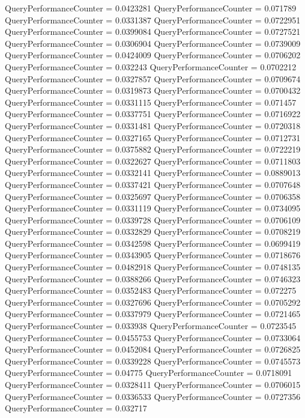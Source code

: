\documentclass[9pt]{article}
\theoremstyle{plain}
\theoremstyle{definition}
\theoremstyle{remark}
\numberwithin{equation}{section}
\begin{document}
QueryPerformanceCounter  =  0.0423281
QueryPerformanceCounter  =  0.071789
QueryPerformanceCounter  =  0.0331387
QueryPerformanceCounter  =  0.0722951
QueryPerformanceCounter  =  0.0399084
QueryPerformanceCounter  =  0.0727521
QueryPerformanceCounter  =  0.0306904
QueryPerformanceCounter  =  0.0739009
QueryPerformanceCounter  =  0.0424009
QueryPerformanceCounter  =  0.0706202
QueryPerformanceCounter  =  0.032243
QueryPerformanceCounter  =  0.0702212
QueryPerformanceCounter  =  0.0327857
QueryPerformanceCounter  =  0.0709674
QueryPerformanceCounter  =  0.0319873
QueryPerformanceCounter  =  0.0700432
QueryPerformanceCounter  =  0.0331115
QueryPerformanceCounter  =  0.071457
QueryPerformanceCounter  =  0.0337751
QueryPerformanceCounter  =  0.0716922
QueryPerformanceCounter  =  0.0331481
QueryPerformanceCounter  =  0.0720318
QueryPerformanceCounter  =  0.0327165
QueryPerformanceCounter  =  0.0712731
QueryPerformanceCounter  =  0.0375882
QueryPerformanceCounter  =  0.0722219
QueryPerformanceCounter  =  0.0322627
QueryPerformanceCounter  =  0.0711803
QueryPerformanceCounter  =  0.0332141
QueryPerformanceCounter  =  0.0889013
QueryPerformanceCounter  =  0.0337421
QueryPerformanceCounter  =  0.0707648
QueryPerformanceCounter  =  0.0325697
QueryPerformanceCounter  =  0.0706358
QueryPerformanceCounter  =  0.0331119
QueryPerformanceCounter  =  0.0734095
QueryPerformanceCounter  =  0.0339728
QueryPerformanceCounter  =  0.0706109
QueryPerformanceCounter  =  0.0332829
QueryPerformanceCounter  =  0.0708219
QueryPerformanceCounter  =  0.0342598
QueryPerformanceCounter  =  0.0699419
QueryPerformanceCounter  =  0.0343905
QueryPerformanceCounter  =  0.0718676
QueryPerformanceCounter  =  0.0482918
QueryPerformanceCounter  =  0.0748135
QueryPerformanceCounter  =  0.0388266
QueryPerformanceCounter  =  0.0746323
QueryPerformanceCounter  =  0.0352483
QueryPerformanceCounter  =  0.072275
QueryPerformanceCounter  =  0.0327696
QueryPerformanceCounter  =  0.0705292
QueryPerformanceCounter  =  0.0337979
QueryPerformanceCounter  =  0.0721465
QueryPerformanceCounter  =  0.033938
QueryPerformanceCounter  =  0.0723545
QueryPerformanceCounter  =  0.0455753
QueryPerformanceCounter  =  0.0733064
QueryPerformanceCounter  =  0.0452084
QueryPerformanceCounter  =  0.0726825
QueryPerformanceCounter  =  0.0339228
QueryPerformanceCounter  =  0.0745573
QueryPerformanceCounter  =  0.04775
QueryPerformanceCounter  =  0.0718091
QueryPerformanceCounter  =  0.0328411
QueryPerformanceCounter  =  0.0706015
QueryPerformanceCounter  =  0.0336533
QueryPerformanceCounter  =  0.0727356
QueryPerformanceCounter  =  0.032717
\end{document}
